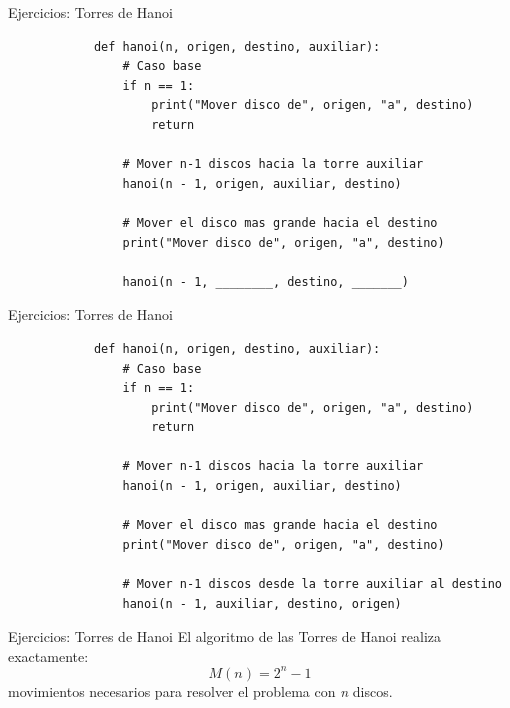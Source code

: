 \documentclass{beamer}
\begin{document}
    \begin{frame}[fragile, t]{Ejercicios: Torres de Hanoi}
        \begin{verbatim}
            def hanoi(n, origen, destino, auxiliar):
                # Caso base
                if n == 1:
                    print("Mover disco de", origen, "a", destino)
                    return

                # Mover n-1 discos hacia la torre auxiliar
                hanoi(n - 1, origen, auxiliar, destino)

                # Mover el disco mas grande hacia el destino
                print("Mover disco de", origen, "a", destino)

                hanoi(n - 1, ________, destino, _______)
        \end{verbatim}
    \end{frame}

    \begin{frame}[fragile, t]{Ejercicios: Torres de Hanoi}
        \begin{verbatim}
            def hanoi(n, origen, destino, auxiliar):
                # Caso base
                if n == 1:
                    print("Mover disco de", origen, "a", destino)
                    return

                # Mover n-1 discos hacia la torre auxiliar
                hanoi(n - 1, origen, auxiliar, destino)

                # Mover el disco mas grande hacia el destino
                print("Mover disco de", origen, "a", destino)

                # Mover n-1 discos desde la torre auxiliar al destino
                hanoi(n - 1, auxiliar, destino, origen)
        \end{verbatim}
    \end{frame}

    \begin{frame}[fragile, t]{Ejercicios: Torres de Hanoi}
        El algoritmo de las Torres de Hanoi realiza exactamente:
        \begin{equation}
            M(n) = 2^{n} - 1
        \end{equation}
        movimientos necesarios para resolver el problema con \textit{n} discos.
    \end{frame}
\end{document}

